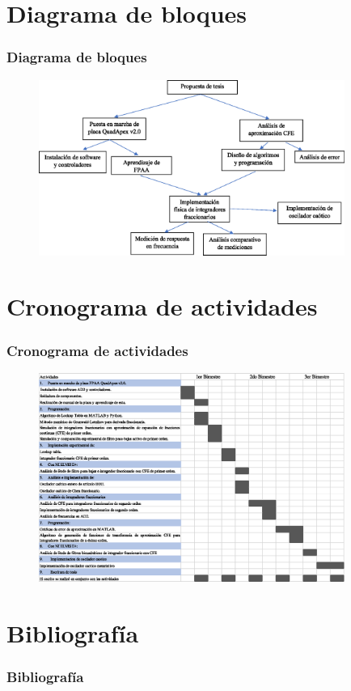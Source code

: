 \documentclass[10pt]{beamer}
\begin{document}
	\section{Diagrama de bloques}
	\begin{frame}
		\frametitle{Diagrama de bloques}
		\begin{figure}[hbtp]
			\centering
			\includegraphics[width = 10cm]{diagrama_de_bloques.eps}
		\end{figure}
	\end{frame}
	
	\section{Cronograma de actividades}
	\begin{frame}
		\frametitle{Cronograma de actividades}
		\begin{figure}[hbtp]
			\centering
			\includegraphics[width = 10cm]{cronograma_de_actividades.eps}
		\end{figure}
	\end{frame}
	
	
	\section{Bibliografía}
	\begin{frame}[t, allowframebreaks]
		\frametitle{Bibliografía}
		\nocite{*}
		
		
	\end{frame}
	
\end{document}
